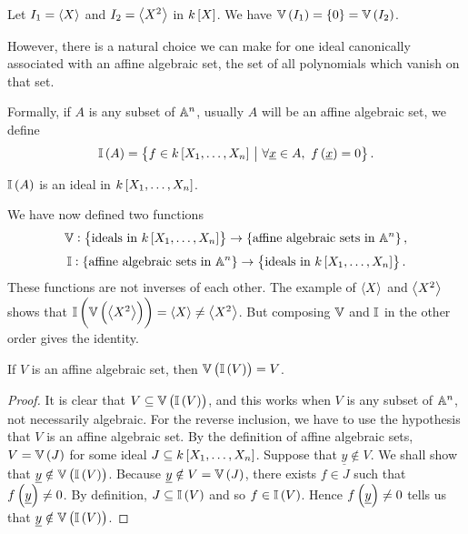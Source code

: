 \begin{example*}
Let $ I_1 = \abr{X} $ and $ I_2 = \abr{X^2} $ in $ k\sbr{X} $. We have $ \VV\br{I_1} = \cbr{0} = \VV\br{I_2} $.
\end{example*}

However, there is a natural choice we can make for one ideal canonically associated with an affine algebraic set, the set of all polynomials which vanish on that set.

\begin{definition*}
Formally, if $ A $ is any subset of $ \AA^n $, usually $ A $ will be an affine algebraic set, we define
$$ \II\br{A} = \cbr{f \in k\sbr{X_1, \dots, X_n} \st \forall \underline{x} \in A, \ f\br{\underline{x}} = 0}. $$
\end{definition*}

\begin{note*}
$ \II\br{A} $ is an ideal in $ k\sbr{X_1, \dots, X_n} $.
\end{note*}

We have now defined two functions
$$ \VV : \cbr{\text{ideals in} \ k\sbr{X_1, \dots, X_n}} \to \cbr{\text{affine algebraic sets in} \ \AA^n}, $$
$$ \II : \cbr{\text{affine algebraic sets in} \ \AA^n} \to \cbr{\text{ideals in} \ k\sbr{X_1, \dots, X_n}}. $$
These functions are not inverses of each other. The example of $ \abr{X} $ and $ \abr{X^2} $ shows that $ \II\br{\VV\br{\abr{X^2}}} = \abr{X} \ne \abr{X^2} $. But composing $ \VV $ and $ \II $ in the other order gives the identity.

\begin{lemma}
\label{lem:viv}
If $ V $ is an affine algebraic set, then $ \VV\br{\II\br{V}} = V $.
\end{lemma}

\begin{proof}
It is clear that $ V \subseteq \VV\br{\II\br{V}} $, and this works when $ V $ is any subset of $ \AA^n $, not necessarily algebraic. For the reverse inclusion, we have to use the hypothesis that $ V $ is an affine algebraic set. By the definition of affine algebraic sets, $ V = \VV\br{J} $ for some ideal $ J \subseteq k\sbr{X_1, \dots, X_n} $. Suppose that $ \underline{y} \notin V $. We shall show that $ \underline{y} \notin \VV\br{\II\br{V}} $. Because $ \underline{y} \notin V = \VV\br{J} $, there exists $ f \in J $ such that $ f\br{\underline{y}} \ne 0 $. By definition, $ J \subseteq \II\br{V} $ and so $ f \in \II\br{V} $. Hence $ f\br{\underline{y}} \ne 0 $ tells us that $ \underline{y} \notin \VV\br{\II\br{V}} $.
\end{proof}


